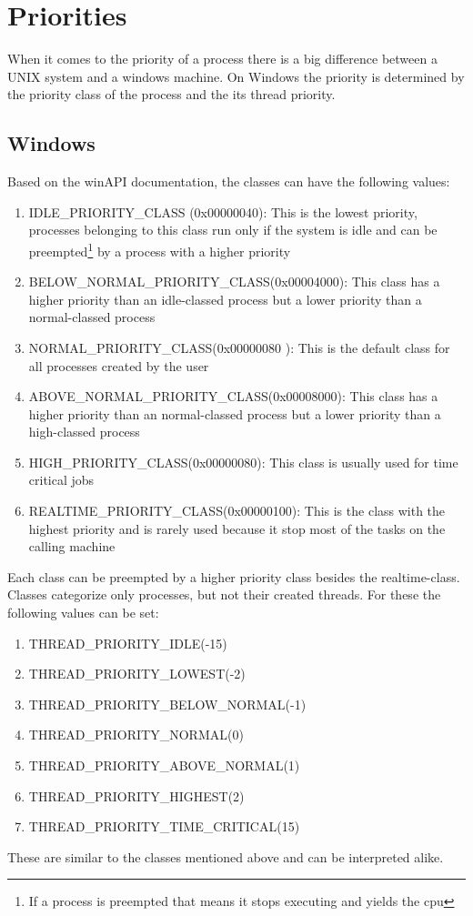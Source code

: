 \section{Priorities}
\label{priorities}
When it comes to the priority of a process there is a big difference between a UNIX system and a
windows machine. On Windows the priority is determined by the priority class of the process and the
its thread priority.\\
\subsection{Windows}
\label{winPrioClass}
Based on the winAPI documentation\cite{priorityClasses}, the classes can have the following values:
\begin{enumerate}
	\item IDLE\_PRIORITY\_CLASS (0x00000040): This is the lowest priority, processes belonging to this class run only if the system is idle and can be preempted\footnote{If a process is preempted that means it stops executing and yields the cpu} by a process with a higher priority
	\item BELOW\_NORMAL\_PRIORITY\_CLASS(0x00004000): This class has a higher priority than an idle-classed process but a lower priority than a normal-classed process 
	\item NORMAL\_PRIORITY\_CLASS(0x00000080
	): This is the default class for all processes created by the user
	\item ABOVE\_NORMAL\_PRIORITY\_CLASS(0x00008000): This class has a higher priority than an normal-classed process but a lower priority than a high-classed process
	\item HIGH\_PRIORITY\_CLASS(0x00000080): This class is usually used for time critical jobs
	\item REALTIME\_PRIORITY\_CLASS(0x00000100): This is the class with the highest priority and is rarely used because it stop most of the tasks on the calling machine
\end{enumerate}
Each class can be preempted by a higher priority class besides the realtime-class. Classes categorize only processes, but not their created threads. For these the following values can be set:
\begin{enumerate}
	\item THREAD\_PRIORITY\_IDLE(-15)
	\item THREAD\_PRIORITY\_LOWEST(-2)
	\item THREAD\_PRIORITY\_BELOW\_NORMAL(-1)
	\item THREAD\_PRIORITY\_NORMAL(0)
	\item THREAD\_PRIORITY\_ABOVE\_NORMAL(1)
	\item THREAD\_PRIORITY\_HIGHEST(2)
	\item THREAD\_PRIORITY\_TIME\_CRITICAL(15)
\end{enumerate}
These are similar to the classes mentioned above and can be interpreted alike.\\
